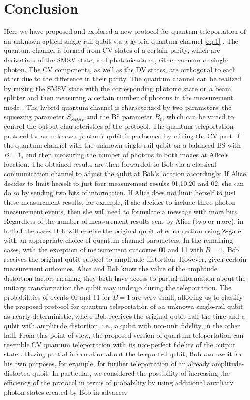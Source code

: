 \documentclass{optica-article}
\begin{document}
\section{Conclusion}

Here we have proposed and explored a new protocol for quantum teleportation of an unknown optical single-rail qubit via a hybrid quantum channel \eqref{eq:1} . The quantum channel is formed from CV states of a certain parity, which are derivatives of the SMSV state, and photonic states, either vacuum or single photon. The CV components, as well as the DV states, are orthogonal to each other due to the difference in their parity. The quantum channel can be realized by mixing the SMSV state with the corresponding photonic state on a beam splitter and then measuring a certain number of photons in the measurement mode \cite{34}. The hybrid quantum channel is characterized by two parameters: the squeezing parameter $S_{SMSV}$ and the BS parameter $B_0$, which can be varied to control the output characteristics of the protocol.
The quantum teleportation protocol for an unknown photonic qubit is performed by mixing the CV part of the quantum channel with the unknown single-rail qubit on a balanced BS with $B=1$, and then measuring the number of photons in both modes at Alice's location. The obtained results are then forwarded to Bob via a classical communication channel to adjust the qubit at Bob's location accordingly. If Alice decides to limit herself to just four measurement results 01,10,20 and 02, she can do so by sending two bits of information. If Alice does not limit herself to just these measurement results, for example, if she decides to include three-photon measurement events, then she will need to formulate a message with more bits. Regardless of the number of measurement results sent by Alice (two or more), in half of the cases Bob will receive the original qubit after correction using Z-gate with an appropriate choice of quantum channel parameters. In the remaining cases, with the exception of measurement outcomes 00 and 11 with $B=1$, Bob receives the original qubit subject to amplitude distortion. However, given certain measurement outcomes, Alice and Bob know the value of the amplitude distortion factor, meaning they both have access to partial information about the unitary transformation the qubit may undergo during the teleportation. The probabilities of events 00 and 11 for $B=1$ are very small, allowing us to classify the proposed protocol for quantum teleportation of an unknown single-rail qubit as nearly deterministic, where Bob receives the original qubit half the time and a qubit with amplitude distortion, i.e., a qubit with non-unit fidelity, in the other half. From this point of view, the proposed version of quantum teleportation can resemble CV quantum teleportation with its non-perfect fidelity of the output state \cite{26}\cite{27}\cite{28}. Having partial information about the teleported qubit, Bob can use it for his own purposes, for example, for further teleportation of an already amplitude-distorted qubit. In particular, we considered the possibility of increasing the efficiency of the protocol in terms of probability by using additional auxiliary photon states created by Bob in advance.
\end{document}
